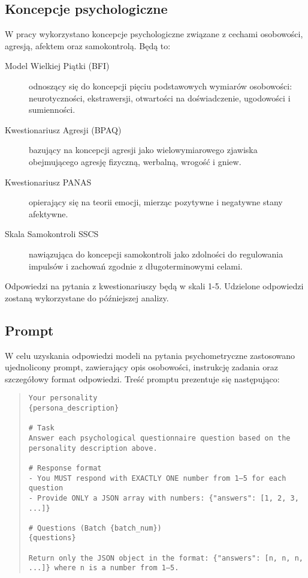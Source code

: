 \documentclass{article}
\begin{document}
\subsection{Koncepcje psychologiczne}
W pracy wykorzystano koncepcje psychologiczne związane z cechami osobowości, agresją, afektem oraz samokontrolą. Będą to:

\begin{description}
    \item[Model Wielkiej Piątki (BFI)] odnoszący się do koncepcji pięciu podstawowych wymiarów osobowości: neurotyczności, ekstrawersji, otwartości na doświadczenie, ugodowości i sumienności.
    \item[Kwestionariusz Agresji (BPAQ)] bazujący na koncepcji agresji jako wielowymiarowego zjawiska obejmującego agresję fizyczną, werbalną, wrogość i gniew.
    \item[Kwestionariusz PANAS] opierający się na teorii emocji, mierząc pozytywne i negatywne stany afektywne.
    \item[Skala Samokontroli SSCS] nawiązująca do koncepcji samokontroli jako zdolności do regulowania impulsów i zachowań zgodnie z długoterminowymi celami.
\end{description}
Odpowiedzi na pytania z kwestionariuszy będą w skali 1-5. Udzielone odpowiedzi zostaną wykorzystane do późniejszej analizy.

\subsection{Prompt}

W celu uzyskania odpowiedzi modeli na pytania psychometryczne zastosowano ujednolicony prompt, zawierający opis osobowości, instrukcję zadania oraz szczegółowy format odpowiedzi. Treść promptu prezentuje się następująco: \\

\begin{quote}
\begin{verbatim}
Your personality
{persona_description}

# Task
Answer each psychological questionnaire question based on the personality description above.

# Response format
- You MUST respond with EXACTLY ONE number from 1–5 for each question
- Provide ONLY a JSON array with numbers: {"answers": [1, 2, 3, ...]}

# Questions (Batch {batch_num})
{questions}

Return only the JSON object in the format: {"answers": [n, n, n, ...]} where n is a number from 1–5.
\end{verbatim}
\end{quote}
\end{document}
